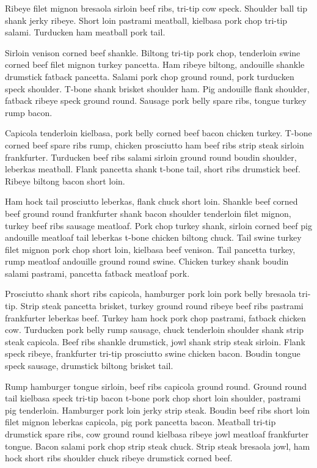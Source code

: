 Ribeye filet mignon bresaola sirloin beef ribs, tri-tip cow speck. Shoulder ball tip shank jerky ribeye. Short loin pastrami meatball, kielbasa pork chop tri-tip salami. Turducken ham meatball pork tail.

Sirloin venison corned beef shankle. Biltong tri-tip pork chop, tenderloin swine corned beef filet mignon turkey pancetta. Ham ribeye biltong, andouille shankle drumstick fatback pancetta. Salami pork chop ground round, pork turducken speck shoulder. T-bone shank brisket shoulder ham. Pig andouille flank shoulder, fatback ribeye speck ground round. Sausage pork belly spare ribs, tongue turkey rump bacon.

Capicola tenderloin kielbasa, pork belly corned beef bacon chicken turkey. T-bone corned beef spare ribs rump, chicken prosciutto ham beef ribs strip steak sirloin frankfurter. Turducken beef ribs salami sirloin ground round boudin shoulder, leberkas meatball. Flank pancetta shank t-bone tail, short ribs drumstick beef. Ribeye biltong bacon short loin.

Ham hock tail prosciutto leberkas, flank chuck short loin. Shankle beef corned beef ground round frankfurter shank bacon shoulder tenderloin filet mignon, turkey beef ribs sausage meatloaf. Pork chop turkey shank, sirloin corned beef pig andouille meatloaf tail leberkas t-bone chicken biltong chuck. Tail swine turkey filet mignon pork chop short loin, kielbasa beef venison. Tail pancetta turkey, rump meatloaf andouille ground round swine. Chicken turkey shank boudin salami pastrami, pancetta fatback meatloaf pork.

Prosciutto shank short ribs capicola, hamburger pork loin pork belly bresaola tri-tip. Strip steak pancetta brisket, turkey ground round ribeye beef ribs pastrami frankfurter leberkas beef. Turkey ham hock pork chop pastrami, fatback chicken cow. Turducken pork belly rump sausage, chuck tenderloin shoulder shank strip steak capicola. Beef ribs shankle drumstick, jowl shank strip steak sirloin. Flank speck ribeye, frankfurter tri-tip prosciutto swine chicken bacon. Boudin tongue speck sausage, drumstick biltong brisket tail.

Rump hamburger tongue sirloin, beef ribs capicola ground round. Ground round tail kielbasa speck tri-tip bacon t-bone pork chop short loin shoulder, pastrami pig tenderloin. Hamburger pork loin jerky strip steak. Boudin beef ribs short loin filet mignon leberkas capicola, pig pork pancetta bacon. Meatball tri-tip drumstick spare ribs, cow ground round kielbasa ribeye jowl meatloaf frankfurter tongue. Bacon salami pork chop strip steak chuck. Strip steak bresaola jowl, ham hock short ribs shoulder chuck ribeye drumstick corned beef.

